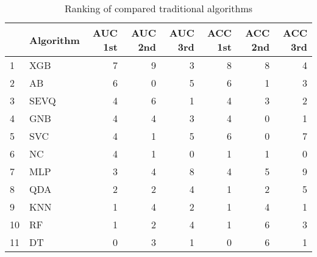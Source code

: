 \begin{table}[H]
\footnotesize
\centering
\caption{Ranking of compared traditional algorithms}
\label{tab:Traditional places}
\begin{tabular}{llrrrrrr}
\hline
{} & Algorithm &  AUC 1st &  AUC 2nd &  AUC 3rd &  ACC 1st &  ACC 2nd &  ACC 3rd \\
\hline
1  &       XGB &        7 &        9 &        3 &             8 &             8 &             4 \\
2  &        AB &        6 &        0 &        5 &             6 &             1 &             3 \\
3  &      SEVQ &        4 &        6 &        1 &             4 &             3 &             2 \\
4  &       GNB &        4 &        4 &        3 &             4 &             0 &             1 \\
5  &       SVC &        4 &        1 &        5 &             6 &             0 &             7 \\
6  &        NC &        4 &        1 &        0 &             1 &             1 &             0 \\
7  &       MLP &        3 &        4 &        8 &             4 &             5 &             9 \\
8  &       QDA &        2 &        2 &        4 &             1 &             2 &             5 \\
9  &       KNN &        1 &        4 &        2 &             1 &             4 &             1 \\
10 &        RF &        1 &        2 &        4 &             1 &             6 &             3 \\
11 &        DT &        0 &        3 &        1 &             0 &             6 &             1 \\
\hline
\end{tabular}
\end{table}
